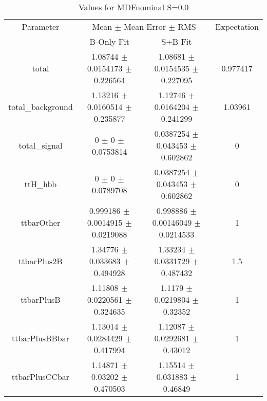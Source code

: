 \begin{table}
\centering
\caption{Values for MDFnominal S=0.0}
\begin{tabular}{cccc}
\toprule
Parameter & \multicolumn{2}{c}{Mean $\pm$ Mean Error $\pm$ RMS} & Expectation\\
 & B-Only Fit & S+B Fit & \\
\midrule
total & \num{1.08744} $\pm$ \num{0.0154173} $\pm$ \num{0.226564} & \num{1.08681} $\pm$ \num{0.0154535} $\pm$ \num{0.227095} & \num{0.977417}\\
total\_background & \num{1.13216} $\pm$ \num{0.0160514} $\pm$ \num{0.235877} & \num{1.12746} $\pm$ \num{0.0164204} $\pm$ \num{0.241299} & \num{1.03961}\\
total\_signal & \num{0} $\pm$ \num{0} $\pm$ \num{0.0753814} & \num{0.0387254} $\pm$ \num{0.043453} $\pm$ \num{0.602862} & \num{0}\\
ttH\_hbb & \num{0} $\pm$ \num{0} $\pm$ \num{0.0789708} & \num{0.0387254} $\pm$ \num{0.043453} $\pm$ \num{0.602862} & \num{0}\\
ttbarOther & \num{0.999186} $\pm$ \num{0.0014915} $\pm$ \num{0.0219088} & \num{0.998886} $\pm$ \num{0.00146049} $\pm$ \num{0.0214533} & \num{1}\\
ttbarPlus2B & \num{1.34776} $\pm$ \num{0.033683} $\pm$ \num{0.494928} & \num{1.33234} $\pm$ \num{0.0331729} $\pm$ \num{0.487432} & \num{1.5}\\
ttbarPlusB & \num{1.11808} $\pm$ \num{0.0220561} $\pm$ \num{0.324635} & \num{1.1179} $\pm$ \num{0.0219804} $\pm$ \num{0.32352} & \num{1}\\
ttbarPlusBBbar & \num{1.13014} $\pm$ \num{0.0284429} $\pm$ \num{0.417994} & \num{1.12087} $\pm$ \num{0.0292681} $\pm$ \num{0.43012} & \num{1}\\
ttbarPlusCCbar & \num{1.14871} $\pm$ \num{0.03202} $\pm$ \num{0.470503} & \num{1.15514} $\pm$ \num{0.031883} $\pm$ \num{0.46849} & \num{1}\\
\bottomrule
\end{tabular}
\end{table}